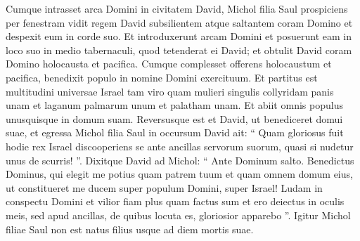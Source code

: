\begin{biblechapter}
\begin{biblechapter}
\begin{biblechapter}
\begin{biblechapter}
\begin{biblechapter}
\begin{biblechapter}
\verse Cumque intrasset arca Domini in civitatem David, Michol filia Saul prospiciens per fenestram vidit regem David subsilientem atque saltantem coram Domino et despexit eum in corde suo.
 \verse Et introduxerunt arcam Domini et posuerunt eam in loco suo in medio tabernaculi, quod tetenderat ei David; et obtulit David coram Domino holocausta et pacifica. 
\verse Cumque complesset offerens holocaustum et pacifica, benedixit populo in nomine Domini exercituum. 
\verse Et partitus est multitudini universae Israel tam viro quam mulieri singulis collyridam panis unam et laganum palmarum unum et palatham unam. Et abiit omnis populus unusquisque in domum suam.
 \verse Reversusque est et David, ut benediceret domui suae, et egressa Michol filia Saul in occursum David ait: “ Quam gloriosus fuit hodie rex Israel discooperiens se ante ancillas servorum suorum, quasi si nudetur unus de scurris! ”. 
\verse Dixitque David ad Michol: “ Ante Dominum salto. Benedictus Dominus, qui elegit me potius quam patrem tuum et quam omnem domum eius, ut constitueret me ducem super populum Domini, super Israel! 
\verse Ludam in conspectu Domini et vilior fiam plus quam factus sum et ero deiectus in oculis meis, sed apud ancillas, de quibus locuta es, gloriosior apparebo ”. 
\verse Igitur Michol filiae Saul non est natus filius usque ad diem mortis suae.
 

\end{biblechapter}
\end{biblechapter}
\end{biblechapter}
\end{biblechapter}
\end{biblechapter}
\end{biblechapter}
